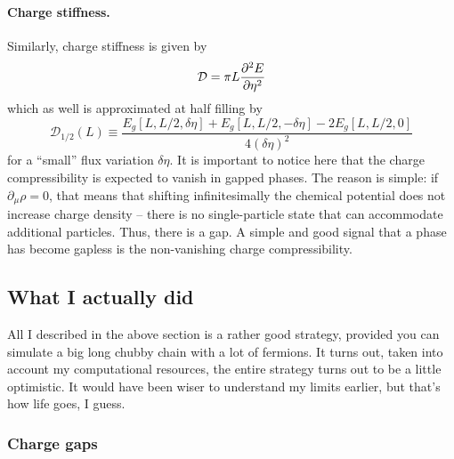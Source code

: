 \paragraph{Charge stiffness.}
Similarly, charge stiffness is given by
\[
	\mathcal{D} = \pi L \pdv[2]{E}{\eta}
\]
which as well is approximated at half filling by
\begin{equation}\label{eq:charge-stiffness-approximation}
	\mathcal{D}_{1/2}(L) \equiv
	\frac{E_g[L,L/2,\delta\eta]+E_g[L,L/2,-\delta\eta]-2E_g[L,L/2,0]}{4(\delta\eta)^2}
\end{equation}
for a ``small'' flux variation $\delta\eta$. It is important to notice here that the charge compressibility is expected to vanish in gapped phases. The reason is simple: if $\partial_\mu \rho=0$, that means that shifting infinitesimally the chemical potential does not increase charge density -- there is no single-particle state that can accommodate additional particles. Thus, there is a gap. A simple and good signal that a phase has become gapless is the non-vanishing charge compressibility.

\subsection{What I actually did}

All I described in the above section is a rather good strategy, provided you can simulate a big long chubby chain with a lot of fermions. It turns out, taken into account my computational resources, the entire strategy turns out to be a little optimistic. It would have been wiser to understand my limits earlier, but that's how life goes, I guess.

\subsubsection*{Charge gaps}

